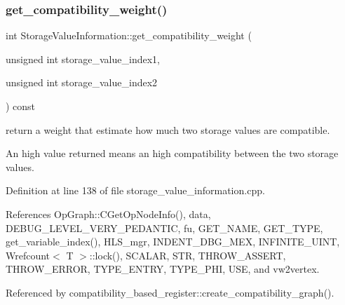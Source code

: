 \subsubsection{\texorpdfstring{get\+\_\+compatibility\+\_\+weight()}{get\_compatibility\_weight()}}
{\footnotesize\ttfamily int Storage\+Value\+Information\+::get\+\_\+compatibility\+\_\+weight (\begin{DoxyParamCaption}\item[{unsigned int}]{storage\+\_\+value\+\_\+index1,  }\item[{unsigned int}]{storage\+\_\+value\+\_\+index2 }\end{DoxyParamCaption}) const}



return a weight that estimate how much two storage values are compatible. 

An high value returned means an high compatibility between the two storage values. 

Definition at line 138 of file storage\+\_\+value\+\_\+information.\+cpp.



References Op\+Graph\+::\+C\+Get\+Op\+Node\+Info(), data, D\+E\+B\+U\+G\+\_\+\+L\+E\+V\+E\+L\+\_\+\+V\+E\+R\+Y\+\_\+\+P\+E\+D\+A\+N\+T\+IC, fu, G\+E\+T\+\_\+\+N\+A\+ME, G\+E\+T\+\_\+\+T\+Y\+PE, get\+\_\+variable\+\_\+index(), H\+L\+S\+\_\+mgr, I\+N\+D\+E\+N\+T\+\_\+\+D\+B\+G\+\_\+\+M\+EX, I\+N\+F\+I\+N\+I\+T\+E\+\_\+\+U\+I\+NT, Wrefcount$<$ T $>$\+::lock(), S\+C\+A\+L\+AR, S\+TR, T\+H\+R\+O\+W\+\_\+\+A\+S\+S\+E\+RT, T\+H\+R\+O\+W\+\_\+\+E\+R\+R\+OR, T\+Y\+P\+E\+\_\+\+E\+N\+T\+RY, T\+Y\+P\+E\+\_\+\+P\+HI, U\+SE, and vw2vertex.



Referenced by compatibility\+\_\+based\+\_\+register\+::create\+\_\+compatibility\+\_\+graph().

